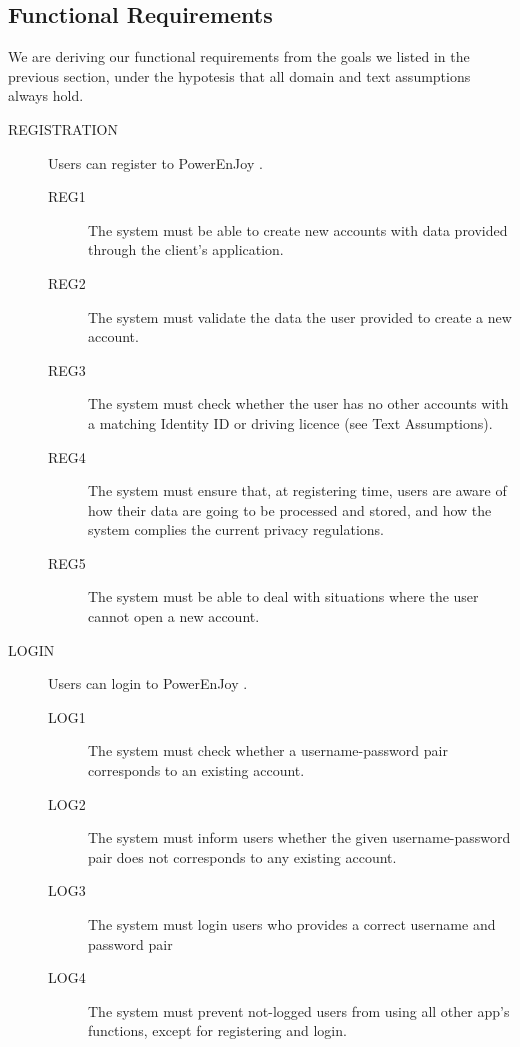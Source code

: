 \documentclass[11pt]{article} %
\newcommand{\pe}{PowerEnJoy }
\begin{document}
\subsection{Functional Requirements}

We are deriving our functional requirements from the goals we listed in the previous section, under the hypotesis that all domain and text assumptions always hold.

\begin{description}
	\item[REGISTRATION] Users can register to \pe.
	\begin{description}
	\item[REG1] The system must be able to create new accounts with data provided through the client's application.
	\item[REG2] The system must validate the data the user provided to create a new account.
	\item[REG3] The system must check whether the user has no other accounts with a matching Identity ID or driving licence (see Text Assumptions).
	\item[REG4] The system must ensure that, at registering time, users are aware of how their data are going to be processed and stored, and how the system complies the current privacy regulations.
	\item[REG5] The system must be able to deal with situations where the user cannot open a new account.
	\end{description}

	\item[LOGIN] Users can login to \pe.
	\begin{description}
	\item[LOG1] The system must check whether a username-password pair corresponds to an existing account.
	\item[LOG2] The system must inform users whether the given username-password pair does not corresponds to any existing account.
	\item[LOG3] The system must login users who provides a correct username and password pair
	\item[LOG4] The system must prevent not-logged users from using all other app's functions, except for registering and login.
	\end{description}


\end{description}
\end{document}
